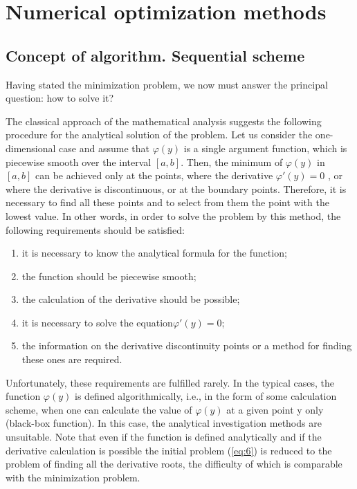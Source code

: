 \section{Numerical optimization methods}
\label{sec:1.2}

\subsection {Concept of algorithm. Sequential scheme}
\label {subsec:1.2.1}

Having stated the minimization problem, we now must answer the principal question: how to solve it?

The classical approach of the mathematical analysis suggests the following procedure for the analytical solution of the problem. Let us consider the one-dimensional case and assume that $\varphi(y)$ is a single argument function, which is piecewise smooth over the interval $[a,b]$. Then, the minimum of $\varphi(y)$ in $[a,b]$ can be achieved only at the points, where the derivative $\varphi'(y)=0$ , or where the derivative is discontinuous, or at the boundary points. Therefore, it is necessary to find all these points and to select from them the point with the lowest value. In other words, in order to solve the problem by this method, the following requirements should be satisfied:
\begin{enumerate}
\item{it is necessary to know the analytical formula for the function;}
\item{the function should be piecewise smooth;}
\item{the calculation of the derivative should be possible;}
\item{it is necessary to solve the equation$\varphi'(y)=0$;}
\item{the information on the derivative discontinuity points or a method for finding these ones are required.}
\end{enumerate}

Unfortunately, these requirements are fulfilled rarely. In the typical cases, the function $\varphi(y)$ is defined algorithmically, i.e., in the form of some calculation scheme, when one can calculate the value of $\varphi(y)$ at a given point y only (black-box function). In this case, the analytical investigation methods are unsuitable. Note that even if the function is defined analytically and if the derivative calculation is possible the initial problem (\ref{eq:6}) is reduced to the problem of finding all the derivative roots, the difficulty of which is comparable with the minimization problem.

